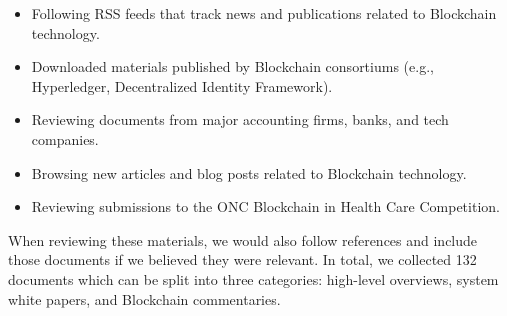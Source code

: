 \begin{itemize}
	\item Following RSS feeds that track news and publications related to Blockchain technology.%
	\item Downloaded materials published by Blockchain consortiums (e.g., Hyperledger, Decentralized Identity Framework).%
	\item Reviewing documents from major accounting firms, banks, and tech companies.
	\item Browsing new articles and blog posts related to Blockchain technology.%
	\item Reviewing submissions to the ONC Blockchain in Health Care Competition.
\end{itemize}

When reviewing these materials, we would also follow references and include those documents if we believed they were relevant.
In total, we collected 132 documents which can be split into three categories: high-level overviews, system white papers, and Blockchain commentaries.


